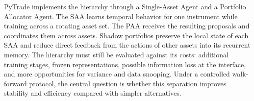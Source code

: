 PyTrade implements the hierarchy through a Single-Asset Agent and a Portfolio Allocator Agent. The SAA learns temporal behavior for one instrument while training across a rotating asset set. The PAA receives the resulting proposals and coordinates them across assets. Shadow portfolios preserve the local state of each SAA and reduce direct feedback from the actions of other assets into its recurrent memory. The hierarchy must still be evaluated against its costs: additional training stages, frozen representations, possible information loss at the interface, and more opportunities for variance and data snooping. Under a controlled walk-forward protocol, the central question is whether this separation improves stability and efficiency compared with simpler alternatives.